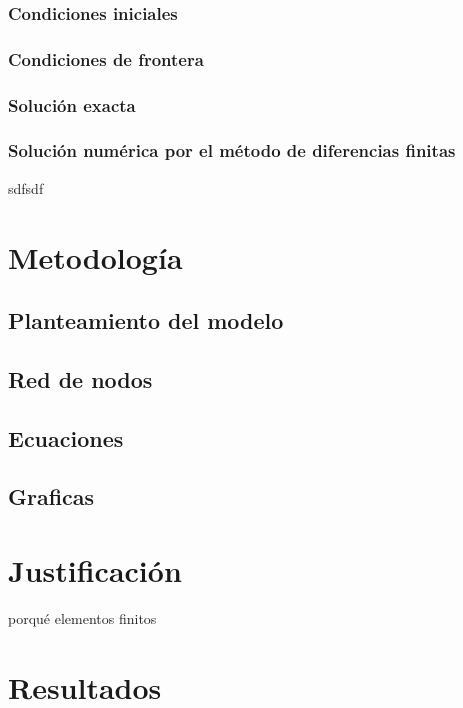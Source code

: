 \documentclass{article}
\begin{document}
	\subsubsection{Condiciones iniciales}
	
	\subsubsection{Condiciones de frontera}
	
	\subsubsection{Solución exacta}
	
	\subsubsection{Solución numérica por el método de diferencias finitas}
	
	sdfsdf\\
		
	\section{Metodología}
	
	\subsection{Planteamiento del modelo}
	
	\subsection{Red de nodos}
	
	\subsection{Ecuaciones}
	
	\subsection{Graficas}	
	
	\section{Justificación}
	
	porqué elementos finitos\\
	
	\section{Resultados}
	
\end{document}
